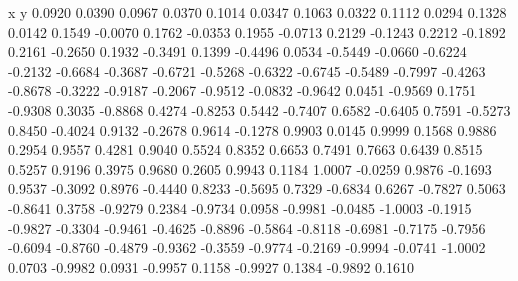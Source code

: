 	x y    
    0.0920    0.0390
    0.0967    0.0370
    0.1014    0.0347
    0.1063    0.0322
    0.1112    0.0294
    0.1328    0.0142
    0.1549   -0.0070
    0.1762   -0.0353
    0.1955   -0.0713
    0.2129   -0.1243
    0.2212   -0.1892
    0.2161   -0.2650
    0.1932   -0.3491
    0.1399   -0.4496
    0.0534   -0.5449
   -0.0660   -0.6224
   -0.2132   -0.6684
   -0.3687   -0.6721
   -0.5268   -0.6322
   -0.6745   -0.5489
   -0.7997   -0.4263
   -0.8678   -0.3222
   -0.9187   -0.2067
   -0.9512   -0.0832
   -0.9642    0.0451
   -0.9569    0.1751
   -0.9308    0.3035
   -0.8868    0.4274
   -0.8253    0.5442
   -0.7407    0.6582
   -0.6405    0.7591
   -0.5273    0.8450
   -0.4024    0.9132
   -0.2678    0.9614
   -0.1278    0.9903
    0.0145    0.9999
    0.1568    0.9886
    0.2954    0.9557
    0.4281    0.9040
    0.5524    0.8352
    0.6653    0.7491
    0.7663    0.6439
    0.8515    0.5257
    0.9196    0.3975
    0.9680    0.2605
    0.9943    0.1184
    1.0007   -0.0259
    0.9876   -0.1693
    0.9537   -0.3092
    0.8976   -0.4440
    0.8233   -0.5695
    0.7329   -0.6834
    0.6267   -0.7827
    0.5063   -0.8641
    0.3758   -0.9279
    0.2384   -0.9734
    0.0958   -0.9981
   -0.0485   -1.0003
   -0.1915   -0.9827
   -0.3304   -0.9461
   -0.4625   -0.8896
   -0.5864   -0.8118
   -0.6981   -0.7175
   -0.7956   -0.6094
   -0.8760   -0.4879
   -0.9362   -0.3559
   -0.9774   -0.2169
   -0.9994   -0.0741
   -1.0002    0.0703
   -0.9982    0.0931
   -0.9957    0.1158
   -0.9927    0.1384
   -0.9892    0.1610